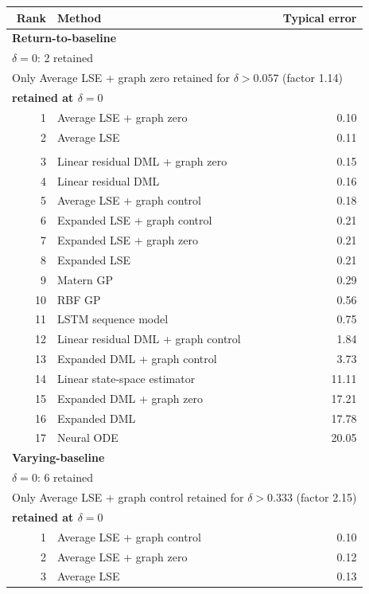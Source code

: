 \begin{tabular}{rlr}
\toprule
Rank & Method & Typical error \\
\midrule
\multicolumn{3}{l}{\textbf{Return-to-baseline}} \\
\multicolumn{3}{l}{\(\delta=0\): 2 retained} \\
\multicolumn{3}{l}{Only Average LSE + graph zero retained for \(\delta>0.057\) (factor 1.14)} \\
\multicolumn{3}{l}{\textbf{retained at \(\delta=0\)}} \\
1 & Average LSE + graph zero & 0.10 \\
2 & Average LSE & 0.11 \\
\addlinespace[2pt]
\multicolumn{3}{l}{\textbf{not retained at \(\delta=0\)}} \\
3 & Linear residual DML + graph zero & 0.15 \\
4 & Linear residual DML & 0.16 \\
5 & Average LSE + graph control & 0.18 \\
6 & Expanded LSE + graph control & 0.21 \\
7 & Expanded LSE + graph zero & 0.21 \\
8 & Expanded LSE & 0.21 \\
9 & Matern GP & 0.29 \\
10 & RBF GP & 0.56 \\
11 & LSTM sequence model & 0.75 \\
12 & Linear residual DML + graph control & 1.84 \\
13 & Expanded DML + graph control & 3.73 \\
14 & Linear state-space estimator & 11.11 \\
15 & Expanded DML + graph zero & 17.21 \\
16 & Expanded DML & 17.78 \\
17 & Neural ODE & 20.05 \\
\midrule
\multicolumn{3}{l}{\textbf{Varying-baseline}} \\
\multicolumn{3}{l}{\(\delta=0\): 6 retained} \\
\multicolumn{3}{l}{Only Average LSE + graph control retained for \(\delta>0.333\) (factor 2.15)} \\
\multicolumn{3}{l}{\textbf{retained at \(\delta=0\)}} \\
1 & Average LSE + graph control & 0.10 \\
2 & Average LSE + graph zero & 0.12 \\
3 & Average LSE & 0.13 \\

\end{tabular}
